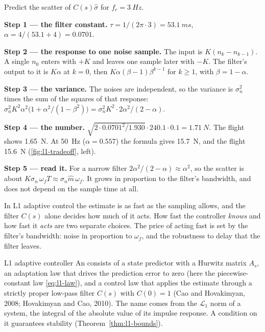 \begin{example}
\label{ex:l1-filtered}
Predict the scatter of $C(s)\hat\sigma$ for $f_c = \SI{3}{Hz}$.

\textbf{Step 1 — the filter constant.} $\tau = 1/(2\pi \cdot 3) = \SI{53.1}{ms}$, $\alpha = 4/(53.1 + 4) = 0.0701$.

\textbf{Step 2 — the response to one noise sample.} The input is $K(n_k - n_{k-1})$. A single $n_0$ enters with $+K$ and leaves one sample later with $-K$. The filter's output to it is $K\alpha$ at $k = 0$, then $K\alpha(\beta - 1)\beta^{k-1}$ for $k \ge 1$, with $\beta = 1 - \alpha$.

\textbf{Step 3 — the variance.} The noises are independent, so the variance is $\sigma_n^2$ times the sum of the squares of that response: $\sigma_n^2K^2\alpha^2\big(1 + \alpha^2/(1 - \beta^2)\big) = \sigma_n^2K^2\cdot 2\alpha^2/(2 - \alpha)$.

\textbf{Step 4 — the number.} $\sqrt{2 \cdot 0.0701^2/1.930} \cdot 240.1 \cdot 0.1 = \SI{1.71}{N}$. The flight shows \SI{1.65}{N}. At \SI{50}{Hz} ($\alpha = 0.557$) the formula gives \SI{15.7}{N}, and the flight \SI{15.6}{N} (\cref{fig:l1-tradeoff}, left).

\textbf{Step 5 — read it.} For a narrow filter $2\alpha^2/(2 - \alpha) \approx \alpha^2$, so the scatter is about $K\sigma_n\,\omega_fT \approx \sigma_n\hat m\,\omega_f$. It grows in proportion to the filter's bandwidth, and does not depend on the sample time at all.
\end{example}

\begin{keyidea}
In L1 adaptive control the estimate is as fast as the sampling allows, and the filter $C(s)$ alone decides how much of it acts. How fast the controller \emph{knows} and how fast it \emph{acts} are two separate choices. The price of acting fast is set by the filter's bandwidth: noise in proportion to $\omega_f$, and the robustness to delay that the filter leaves.
\end{keyidea}

\begin{definition}{L1 adaptive controller}
An  consists of a state predictor with a Hurwitz matrix $A_s$, an adaptation law that drives the prediction error to zero (here the piecewise-constant law \cref{eq:l1-law}), and a control law that applies the estimate through a strictly proper low-pass filter $C(s)$ with $C(0) = 1$ (Cao and Hovakimyan, 2008; Hovakimyan and Cao, 2010). The name comes from the $\mathcal L_1$ norm of a system, the integral of the absolute value of its impulse response. A condition on it guarantees stability (Theorem~\ref{thm:l1-bounds}).
\end{definition}

